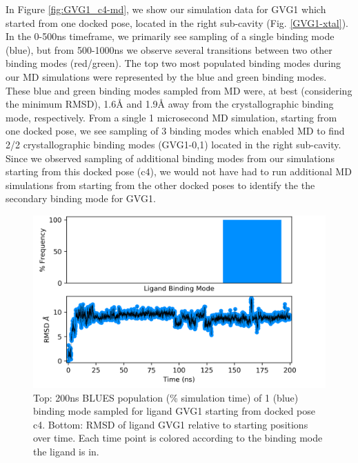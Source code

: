 In Figure \ref{fig:GVG1_c4-md}, we show our simulation data for GVG1 which started from one docked pose, located in the right sub-cavity (Fig. \ref{GVG1-xtal}).
In the 0-500ns timeframe, we primarily see sampling of a single binding mode (blue), but from 500-1000ns we observe several transitions between two other binding modes (red/green).
The top two most populated binding modes during our MD simulations were represented by the blue and green binding modes.
These blue and green binding modes sampled from MD were, at best (considering the minimum RMSD), 1.6{\AA} and 1.9{\AA} away from the crystallographic binding mode, respectively.
From a single 1 microsecond MD simulation, starting from one docked pose, we see sampling of 3 binding modes which enabled MD to find 2/2 crystallographic binding modes (GVG1-0,1) located in the right sub-cavity.
Since we observed sampling of additional binding modes from our simulations starting from this docked pose (c4), we would not have had to run additional MD simulations from starting from the other docked poses to identify the the secondary binding mode for GVG1.

\begin{figure}
    \centering
    \includegraphics{chapter6/Figures/GVG_1_c4-14650607.png}
    \caption[GVG1 (c4) BLUES Populations]{Top: 200ns BLUES population (\% simulation time) of 1 (blue) binding mode sampled for ligand GVG1 starting from docked pose c4. Bottom: RMSD of ligand GVG1 relative to starting positions over time. Each time point is colored according to the binding mode the ligand is in.}
    \label{fig:GVG1_c4-blues}
\end{figure}

